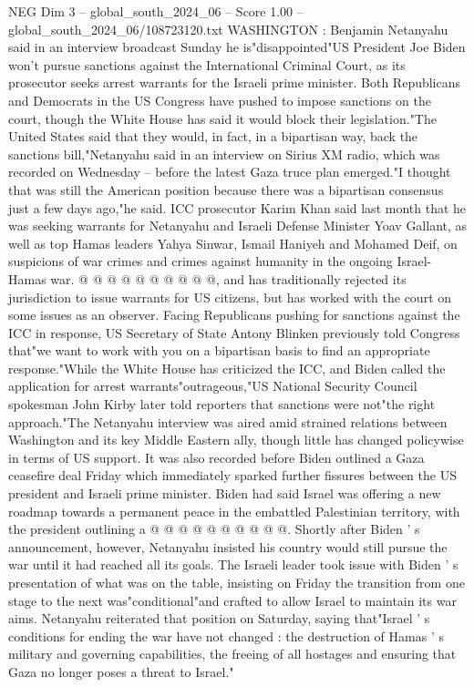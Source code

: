 \begin{textsample}{NEG Dim 3 – global\_south\_2024\_06 – Score 1.00 – global\_south\_2024\_06/108723120.txt}  \label{ex:f3_neg_118}
WASHINGTON : Benjamin Netanyahu said in an interview broadcast Sunday he is"disappointed"US President Joe Biden won't pursue sanctions against the International Criminal Court, as its prosecutor seeks arrest warrants for the Israeli prime minister.
Both Republicans and Democrats in the US Congress have pushed to impose sanctions on the court, though the White House has said it would block their legislation."The United States said that they would, in fact, in a bipartisan way, back the sanctions bill,"Netanyahu said in an interview on Sirius XM radio, which was recorded on Wednesday -- before the latest Gaza truce plan emerged."I thought that was still the American position because there was a bipartisan consensus just a few days ago,"he said.
ICC prosecutor Karim Khan said last month that he was seeking warrants for Netanyahu and Israeli Defense Minister Yoav Gallant, as well as top Hamas leaders Yahya Sinwar, Ismail Haniyeh and Mohamed Deif, on suspicions of war crimes and crimes against humanity in the ongoing Israel-Hamas war. @ @ @ @ @ @ @ @ @ @, and has traditionally rejected its jurisdiction to issue warrants for US citizens, but has worked with the court on some issues as an observer.
Facing Republicans pushing for sanctions against the ICC in response, US Secretary of State Antony Blinken previously told Congress that"we want to work with you on a bipartisan basis to find an appropriate response."While the White House has criticized the ICC, and Biden called the application for arrest warrants"outrageous,"US National Security Council spokesman John Kirby later told reporters that sanctions were not"the right approach."The Netanyahu interview was aired amid strained relations between Washington and its key Middle Eastern ally, though little has changed policywise in terms of US support.
It was also recorded before Biden outlined a Gaza ceasefire deal Friday which immediately sparked further fissures between the US president and Israeli prime minister.
Biden had said Israel was offering a new roadmap towards a permanent peace in the embattled Palestinian territory, with the president outlining a @ @ @ @ @ @ @ @ @ @.
Shortly after Biden ' s announcement, however, Netanyahu insisted his country would still pursue the war until it had reached all its goals.
The Israeli leader took issue with Biden ' s presentation of what was on the table, insisting on Friday the transition from one stage to the next was"conditional"and crafted to allow Israel to maintain its war aims.
Netanyahu reiterated that position on Saturday, saying that"Israel ' s conditions for ending the war have not changed : the destruction of Hamas ' s military and governing capabilities, the freeing of all hostages and ensuring that Gaza no longer poses a threat to Israel."

\end{textsample}
